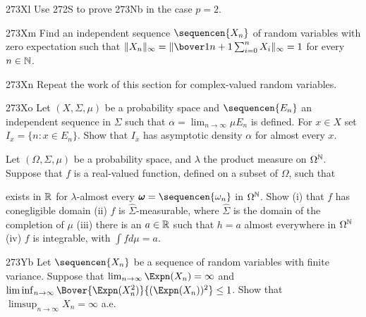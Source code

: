 {\spheader 273Xl Use 272S to prove 273Nb in the case $p=2$.

\spheader 273Xm Find an independent sequence $\sequencen{X_n}$ of random
variables with zero expectation such that
$\|X_n\|_{\infty}=\|\bover1{n+1}\sum_{i=0}^nX_i\|_{\infty}=1$ for every
$n\in\Bbb N$.

\spheader 273Xn Repeat the work of this section for
complex-valued random variables.

\spheader 273Xo Let $(X,\Sigma,\mu)$ be a probability space and
$\sequencen{E_n}$ an independent sequence in $\Sigma$ such that
$\alpha=\lim_{n\to\infty}\mu E_n$ is defined.   For $x\in X$ set
$I_x=\{n:x\in E_n\}$.   Show that $I_x$ has asymptotic density $\alpha$ for
almost every $x$.

Let $(\Omega,\Sigma,\mu)$ be a
probability space, and $\lambda$ the product measure on
$\Omega^{\Bbb N}$.   Suppose that $f$ is a real-valued function, defined
on a subset of $\Omega$, such that


\noindent exists in $\Bbb R$ for $\lambda$-almost every
$\pmb{\omega}=\sequencen{\omega_n}$ in $\Omega^{\Bbb N}$.   Show (i)
that $f$ has conegligible domain (ii) $f$ is $\hat\Sigma$-measurable, where
$\hat\Sigma$ is the domain of the
completion of $\mu$ (iii) there is an $a\in\Bbb R$ such that $h=a$
almost everywhere in $\Omega^{\Bbb N}$ (iv) $f$ is integrable, with
$\int fd\mu=a$.

\spheader 273Yb
Let $\sequencen{X_n}$ be a sequence of random variables
with finite variance.   Suppose that $\lim_{n\to\infty}\Expn(X_n)=\infty$
and $\liminf_{n\to\infty}
\Bover{\Expn(X_n^2)}{(\Expn(X_n))^2}\le 1$.
Show that $\limsup_{n\to\infty}X_n=\infty$ a.e.	
}%

